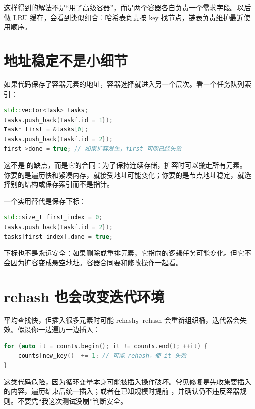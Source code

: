 这样得到的解法不是“用了高级容器”，而是两个容器各自负责一个需求字段。以后做 LRU 缓存，会看到类似组合：哈希表负责按 key 找节点，链表负责维护最近使用顺序。

\section{地址稳定不是小细节}

如果代码保存了容器元素的地址，容器选择就进入另一个层次。看一个任务队列索引：

\begin{lstlisting}[language=C++,caption={保存 vector 元素指针的风险}]
std::vector<Task> tasks;
tasks.push_back(Task{.id = 1});
Task* first = &tasks[0];
tasks.push_back(Task{.id = 2});
first->done = true; // 如果扩容发生，first 可能已经失效
\end{lstlisting}

这不是  的缺点，而是它的合同：为了保持连续存储，扩容时可以搬走所有元素。你要的是遍历快和紧凑内存，就接受地址可能变化；你要的是节点地址稳定，就选择别的结构或保存索引而不是指针。

一个实用替代是保存下标：

\begin{lstlisting}[language=C++,caption={保存下标而不是元素指针}]
std::size_t first_index = 0;
tasks.push_back(Task{.id = 2});
tasks[first_index].done = true;
\end{lstlisting}

下标也不是永远安全：如果删除或重排元素，它指向的逻辑任务可能变化。但它不会因为扩容变成悬空地址。容器合同要和修改操作一起看。

\section{rehash 也会改变迭代环境}

 平均查找快，但插入很多元素时可能 rehash。rehash 会重新组织桶，迭代器会失效。假设你一边遍历一边插入：

\begin{lstlisting}[language=C++,caption={遍历哈希表时插入要小心}]
for (auto it = counts.begin(); it != counts.end(); ++it) {
    counts[new_key()] += 1; // 可能 rehash，使 it 失效
}
\end{lstlisting}

这类代码危险，因为循环变量本身可能被插入操作破坏。常见修复是先收集要插入的内容，遍历结束后统一插入；或者在已知规模时提前 ，并确认仍不违反容器规则。不要凭“我这次测试没崩”判断安全。

